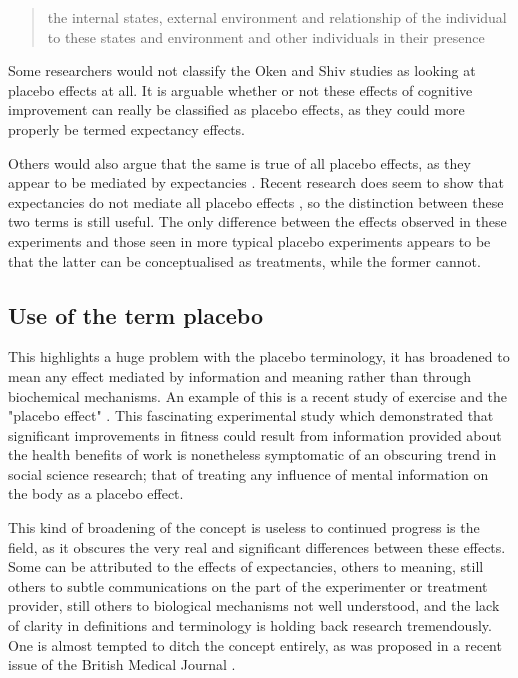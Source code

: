 \begin{quotation}
   the internal states, external environment and relationship of the individual to these states and environment and other individuals in their presence 
\end{quotation}


Some researchers would not classify the Oken and Shiv studies as looking at placebo effects at all. It is arguable whether or not these effects of cognitive improvement can really be classified as placebo effects, as they could more properly be termed expectancy effects. 

Others would also argue that the same is true of all placebo effects, as they appear to be mediated by expectancies \cite{Kirsch1985, Kirsch1997,Montgomery1997}. Recent research does seem to show that expectancies do not mediate all placebo effects \cite{Benedetti2003a}, so the distinction between these two terms is still useful.  The only difference between the effects observed in these experiments and those seen in more typical placebo experiments appears to be that the latter can be conceptualised as treatments, while the former cannot. 

\subsection{Use of the term placebo}
\label{sec:use-term-placebo}



This highlights a huge problem with the placebo terminology, it has broadened to mean any effect mediated by information and meaning rather than through biochemical mechanisms. An example of this is a recent study of exercise and the "placebo effect" \cite{Crum2007}. This fascinating experimental study which demonstrated that significant improvements in fitness could result from information provided about the health benefits of work is nonetheless symptomatic of an obscuring trend in social science research; that of treating any influence of mental information on the body as a placebo effect. 

This kind of broadening of the concept is  useless to continued progress is the field, as it obscures the very real and significant differences between these effects. Some can be attributed to the effects of expectancies, others to meaning, still others to subtle communications on the part of the experimenter or treatment provider, still others to biological mechanisms not well understood, and the lack of clarity in definitions and terminology is holding back research tremendously. One is almost tempted to ditch the concept entirely, as was proposed in a recent issue of the British Medical Journal \cite{nunn2009s}. 

